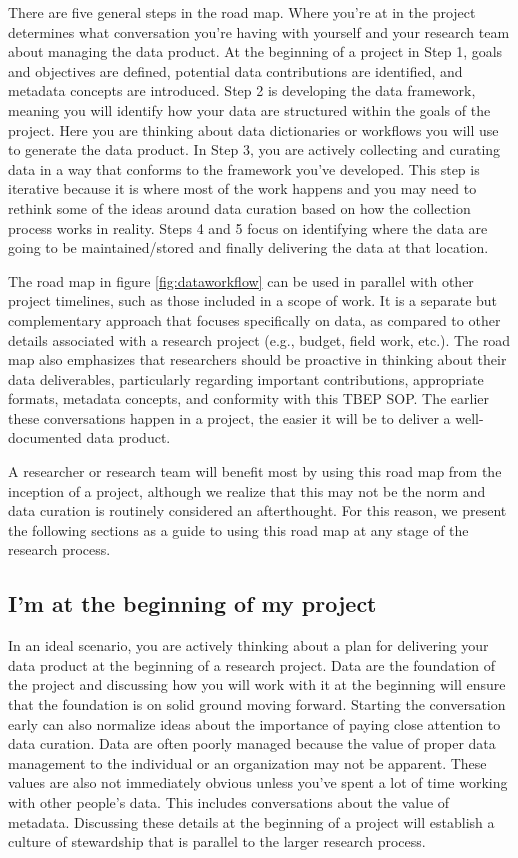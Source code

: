 \documentclass[
]{book}
\begin{document}
There are five general steps in the road map. Where you're at in the project determines what conversation you're having with yourself and your research team about managing the data product. At the beginning of a project in Step 1, goals and objectives are defined, potential data contributions are identified, and metadata concepts are introduced. Step 2 is developing the data framework, meaning you will identify how your data are structured within the goals of the project. Here you are thinking about data dictionaries or workflows you will use to generate the data product. In Step 3, you are actively collecting and curating data in a way that conforms to the framework you've developed. This step is iterative because it is where most of the work happens and you may need to rethink some of the ideas around data curation based on how the collection process works in reality. Steps 4 and 5 focus on identifying where the data are going to be maintained/stored and finally delivering the data at that location.

The road map in figure \ref{fig:dataworkflow} can be used in parallel with other project timelines, such as those included in a scope of work. It is a separate but complementary approach that focuses specifically on data, as compared to other details associated with a research project (e.g., budget, field work, etc.). The road map also emphasizes that researchers should be proactive in thinking about their data deliverables, particularly regarding important contributions, appropriate formats, metadata concepts, and conformity with this TBEP SOP. The earlier these conversations happen in a project, the easier it will be to deliver a well-documented data product.

A researcher or research team will benefit most by using this road map from the inception of a project, although we realize that this may not be the norm and data curation is routinely considered an afterthought. For this reason, we present the following sections as a guide to using this road map at any stage of the research process.

\hypertarget{beginning}{%
\subsection{I'm at the beginning of my project}\label{beginning}}

In an ideal scenario, you are actively thinking about a plan for delivering your data product at the beginning of a research project. Data are the foundation of the project and discussing how you will work with it at the beginning will ensure that the foundation is on solid ground moving forward. Starting the conversation early can also normalize ideas about the importance of paying close attention to data curation. Data are often poorly managed because the value of proper data management to the individual or an organization may not be apparent. These values are also not immediately obvious unless you've spent a lot of time working with other people's data. This includes conversations about the value of metadata. Discussing these details at the beginning of a project will establish a culture of stewardship that is parallel to the larger research process.
\end{document}
